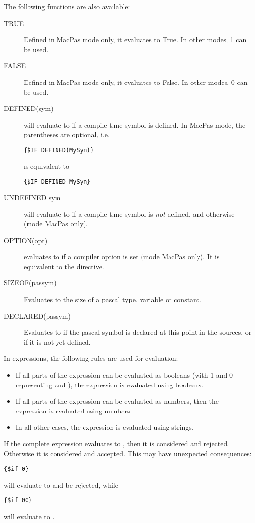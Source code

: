 The following functions are also available:
\begin{description}
\item[TRUE] Defined in MacPas mode only, it evaluates to True. In other
modes, 1 can be used.
\item[FALSE] Defined in MacPas mode only, it evaluates to False. In other
modes, 0 can be used.
\item[DEFINED(sym)] will evaluate to  if a compile time symbol is
defined. In MacPas mode, the parentheses are optional, i.e. 
\begin{verbatim}
{$IF DEFINED(MySym)}
\end{verbatim}
is equivalent to 
\begin{verbatim}
{$IF DEFINED MySym}
\end{verbatim}
\item[UNDEFINED sym] will evaluate to  if a compile time symbol is {\em
not} defined, and  otherwise (mode MacPas only).
\item[OPTION(opt)] evaluates to  if a compiler option is set (mode MacPas
only). It is equivalent to the  directive.
\item[SIZEOF(passym)] Evaluates to the size of a pascal type, variable or
constant.
\item[DECLARED(passym)] Evaluates to  if the pascal symbol is
declared at this point in the sources, or  if it is not yet
defined.
\end{description}

In expressions, the following rules are used for evaluation:
\begin{itemize}
\item If all parts of the expression can be evaluated as booleans (with 1
and 0 representing  and ), the expression is evaluated
using booleans. 
\item If all parts of the expression can be evaluated as numbers, then the
expression is evaluated using numbers.
\item In all other cases, the expression is evaluated using strings.
\end{itemize}
If the complete expression evaluates to , then it is considered
 and rejected. Otherwise it is considered  and accepted. 
This may have unexpected consequences:
\begin{verbatim}
{$if 0}
\end{verbatim}
will evaluate to  and be rejected, while
\begin{verbatim}
{$if 00}
\end{verbatim}
will evaluate to .


